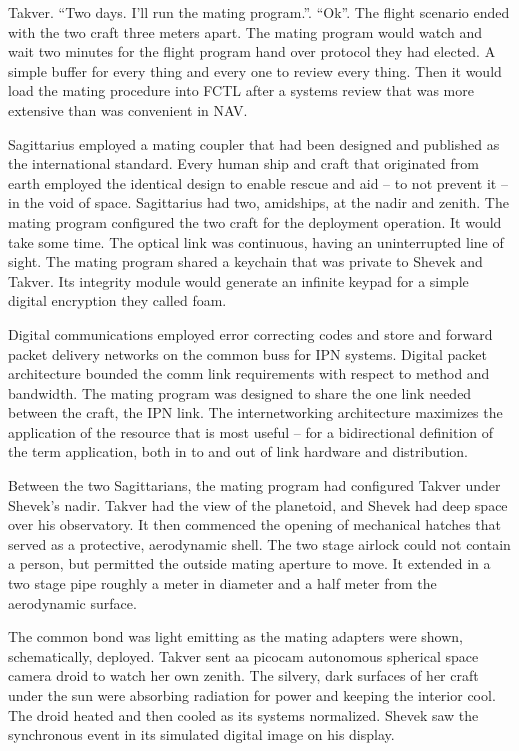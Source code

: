 Takver.  ``Two days.  I'll run the mating program.''.  ``Ok''.  The
flight scenario ended with the two craft three meters apart.  The
mating program would watch and wait two minutes for the flight program
hand over protocol they had elected.  A simple buffer for every thing
and every one to review every thing.  Then it would load the mating
procedure into FCTL after a systems review that was more extensive
than was convenient in NAV.

Sagittarius employed a mating coupler that had been designed and
published as the international standard.  Every human ship and craft
that originated from earth employed the identical design to enable
rescue and aid -- to not prevent it -- in the void of space.
Sagittarius had two, amidships, at the nadir and zenith.  The mating
program configured the two craft for the deployment operation.  It
would take some time.  The optical link was continuous, having an
uninterrupted line of sight.  The mating program shared a keychain
that was private to Shevek and Takver.  Its integrity module would
generate an infinite keypad for a simple digital encryption they
called foam.

Digital communications employed error correcting codes and store and
forward packet delivery networks on the common buss for IPN systems.
Digital packet architecture bounded the comm link requirements with
respect to method and bandwidth.  The mating program was designed to
share the one link needed between the craft, the IPN link.  The
internetworking architecture maximizes the application of the resource
that is most useful -- for a bidirectional definition of the term
application, both in to and out of link hardware and distribution.

Between the two Sagittarians, the mating program had configured Takver
under Shevek's nadir.  Takver had the view of the planetoid, and
Shevek had deep space over his observatory.  It then commenced the
opening of mechanical hatches that served as a protective, aerodynamic
shell.  The two stage airlock could not contain a person, but
permitted the outside mating aperture to move.  It extended in a two
stage pipe roughly a meter in diameter and a half meter from the
aerodynamic surface.

The common bond was light emitting as the mating adapters were shown,
schematically, deployed.  Takver sent aa picocam autonomous spherical
space camera droid to watch her own zenith.  The silvery, dark
surfaces of her craft under the sun were absorbing radiation for power
and keeping the interior cool.  The droid heated and then cooled as
its systems normalized.  Shevek saw the synchronous event in its
simulated digital image on his display.

